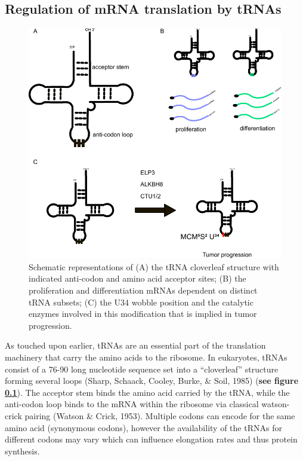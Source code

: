 \documentclass[12pt,openany]{book}
\begin{document}
\subsection{Regulation of mRNA translation by tRNAs} \label{tRNA}\begin{figure}
  \includegraphics{./figures/tRNA.pdf}
  \caption{ Schematic representations of (A) the tRNA cloverleaf structure with indicated anti-codon and amino acid acceptor sites;  (B)  the proliferation and differentiation mRNAs dependent on distinct tRNA subsets; (C) the U34 wobble position and the catalytic enzymes involved in this modification that is implied in tumor progression.
 \label{fig:tRNA}}
\end{figure}

As touched upon earlier, tRNAs are an essential part of the translation
machinery that carry the amino acids to the ribosome. In eukaryotes,
tRNAs consist of a 76-90 long nucleotide sequence set into a
``cloverleaf'' structure forming several loops (Sharp, Schaack, Cooley,
Burke, \& Soil, 1985) (\textbf{see figure \ref{tRNA}}). The acceptor
stem binds the amino acid carried by the tRNA, while the anti-codon loop
binds to the mRNA within the ribosome via classical watson-crick pairing
(Watson \& Crick, 1953). Multiple codons can encode for the same amino
acid (synonymous codons), however the availability of the tRNAs for
different codons may vary which can influence elongation rates and thus
protein synthesis.
\end{document}
